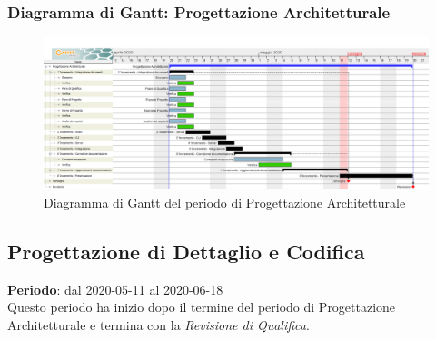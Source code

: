 	\subsubsection{Diagramma di Gantt: Progettazione Architetturale}
		\begin{figure}[h]
			\centering
			\includegraphics[width=1.1\textwidth]{./res/img/DiagrammiGantt/prog_arch_gantt.png}
			\caption{Diagramma di Gantt del periodo di Progettazione Architetturale}
		\end{figure}
\newpage

\subsection{Progettazione di Dettaglio e Codifica}
\textbf{Periodo}: dal 2020-05-11 al 2020-06-18 \\
Questo periodo ha inizio dopo il termine del periodo di Progettazione Architetturale e termina con la \textit{Revisione di Qualifica}. \\

